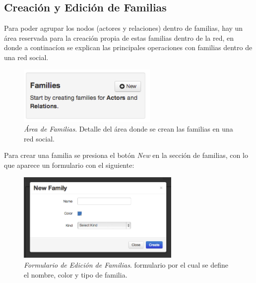 

\subsection{Creación y Edición de Familias} %
\label{sub:creacion_y_edicion_de_familias}

Para poder agrupar los nodos (actores y relaciones) dentro de familias, hay un área reservada para la creación propia de estas familias dentro de la red, en donde a continacíon se explican las principales operaciones con familias dentro de una red social.\\

\begin{figure}[H]
  \centering
  \includegraphics[width=0.6\textwidth]{images/area_familias.png}
  \caption[Área de Familias]{\emph{Área de Familias}. Detalle del área donde se crean las familias en una red social.}
  \label{area_familias}
\end{figure}

Para crear una familia se presiona el botón \emph{New} en la sección de familias, con lo que aparece un formulario con el siguiente:

\begin{figure}[H]
  \centering
  \includegraphics[width=0.7\textwidth]{images/edicion_familias.png}
  \caption[Formulario de Edición de Familias]{\emph{Formulario de Edición de Familias}. formulario por el cual se define el nombre, color y tipo de familia.}
  \label{edicion_familias}
\end{figure}

